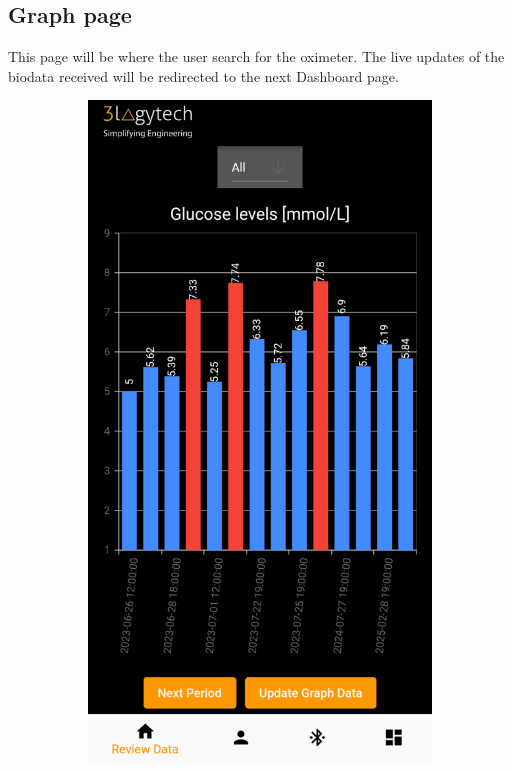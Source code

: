 \documentclass[a4paper]{scrreprt}
\begin{document}
\subsection{Graph page}
This page will be where the user search for the oximeter. The live updates of the biodata received will be redirected to the next Dashboard page.
\begin{figure}[h]
    \centering
    \begin{subfigure}{0.45\textwidth}
        \centering
        \includegraphics[scale=0.5]{graph_all.png}

\end{subfigure}
\end{figure}
\end{document}
